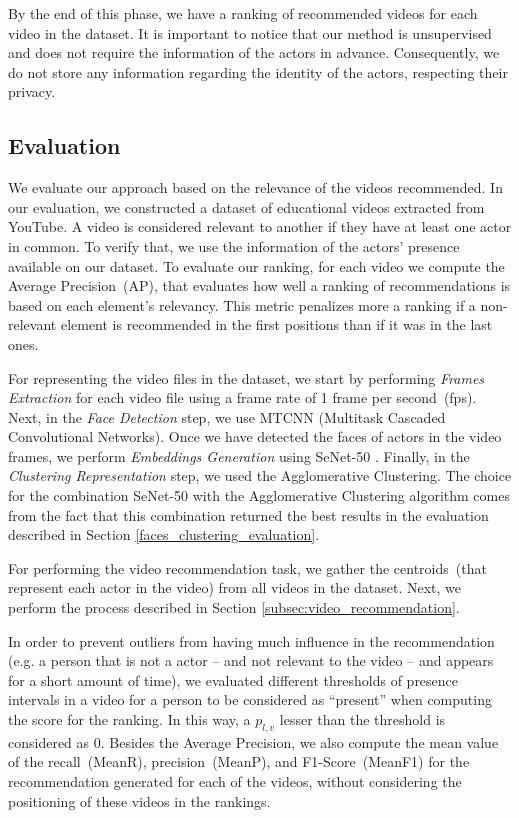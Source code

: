 By the end of this phase, we have a ranking of recommended videos for each video in the dataset.
It is important to notice that our method is unsupervised and does not require the information of the actors in advance.
Consequently, we do not store any information regarding the identity of the actors, respecting their privacy.

\subsection{Evaluation}
We evaluate our approach based on the relevance of the videos recommended. 
In our evaluation, we constructed a dataset of educational videos extracted from YouTube.
A video is considered relevant to another if they have at least one actor in common.
To verify that, we use the information of the actors' presence available on our dataset.
To evaluate our ranking, for each video we compute the Average Precision~(AP), that evaluates how well a ranking of recommendations is based on each element's relevancy. 
This metric penalizes more a ranking if a non-relevant element is recommended in the first positions than if it was in the last ones.


For representing the video files in the dataset, we start by performing \emph{Frames Extraction} for each video file using a frame rate of 1 frame per second~(fps). 
Next, in the \emph{Face Detection} step, we use MTCNN \cite{mtcnn} (Multitask
Cascaded Convolutional Networks). 
Once we have detected the faces of actors in the video frames, we perform \emph{Embeddings Generation} using SeNet-50 \cite{senet}.
Finally, in the \emph{Clustering Representation} step, we used the Agglomerative Clustering.
The choice for the combination SeNet-50 with the Agglomerative Clustering algorithm comes from the fact that this combination returned the best results in the evaluation described in Section \ref{faces_clustering_evaluation}.

For performing the video recommendation task, we gather the centroids~(that represent each actor in the video) from all videos in the dataset. Next, we perform the process described in Section \ref{subsec:video_recommendation}.

In order to prevent outliers from having much influence in the recommendation (e.g. a person that is not a actor -- and not relevant to the video -- and appears for a short amount of time), we evaluated different thresholds of presence intervals in a video for a person to be considered as ``present'' when computing the score for the ranking. 
In this way, a $p_{l,v}$ lesser than the threshold is considered as $0$.
Besides the Average Precision, we also compute the mean value of the recall~(MeanR), precision~(MeanP), and F1-Score~(MeanF1) for the recommendation generated for each of the videos, without considering the positioning of these videos in the rankings.

